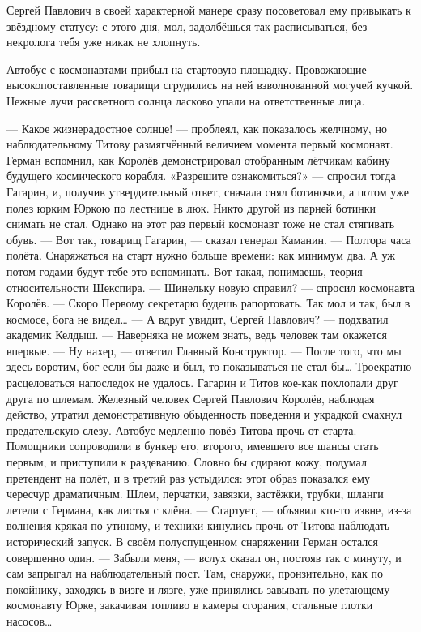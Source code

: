Сергей Павлович в своей характерной манере сразу посоветовал ему привыкать к
звёздному статусу: с этого дня, мол, задолбёшься так расписываться, без
некролога тебя уже никак не хлопнуть.

Автобус с космонавтами прибыл на стартовую площадку. Провожающие
высокопоставленные товарищи сгрудились на ней взволнованной могучей кучкой.
Нежные лучи рассветного солнца ласково упали на ответственные лица.

— Какое жизнерадостное солнце! — проблеял, как показалось желчному, но наблюдательному Титову размягчённый величием момента первый космонавт.
Герман вспомнил, как Королёв демонстрировал отобранным лётчикам кабину будущего космического корабля. «Разрешите ознакомиться?» — спросил тогда Гагарин, и, получив утвердительный ответ, сначала снял ботиночки, а потом уже полез юрким Юркою по лестнице в люк. Никто другой из парней ботинки снимать не стал.
Однако на этот раз первый космонавт тоже не стал стягивать обувь.
— Вот так, товарищ Гагарин, — сказал генерал Каманин. — Полтора часа полёта. Снаряжаться на старт нужно больше времени: как минимум два. А уж потом годами будут тебе это вспоминать. Вот такая, понимаешь, теория относительности Шекспира.
— Шинельку новую справил? — спросил космонавта Королёв. — Скоро Первому секретарю будешь рапортовать. Так мол и так, был в космосе, бога не видел…
— А вдруг увидит, Сергей Павлович? — подхватил академик Келдыш. — Наверняка не можем знать, ведь человек там окажется впервые.
— Ну нахер, — ответил Главный Конструктор. — После того, что мы здесь воротим, бог если бы даже и был, то показываться не стал бы…
Троекратно расцеловаться напоследок не удалось. Гагарин и Титов кое-как похлопали друг друга по шлемам. Железный человек Сергей Павлович Королёв, наблюдая действо, утратил демонстративную обыденность поведения и украдкой смахнул предательскую слезу.
Автобус медленно повёз Титова прочь от старта. Помощники сопроводили в бункер его, второго, имевшего все шансы стать первым, и приступили к раздеванию. Словно бы сдирают кожу, подумал претендент на полёт, и в третий раз устыдился: этот образ показался ему чересчур драматичным.
Шлем, перчатки, завязки, застёжки, трубки, шланги летели с Германа, как листья с клёна.
— Стартует, — объявил кто-то извне, из-за волнения крякая по-утиному, и техники кинулись прочь от Титова наблюдать исторический запуск.
В своём полуспущенном снаряжении Герман остался совершенно один.
— Забыли меня, — вслух сказал он, постояв так с минуту, и сам запрыгал на наблюдательный пост. Там, снаружи, пронзительно, как по покойнику, заходясь в визге и лязге, уже принялись завывать по улетающему  космонавту Юрке, закачивая топливо в камеры сгорания, стальные глотки насосов…

